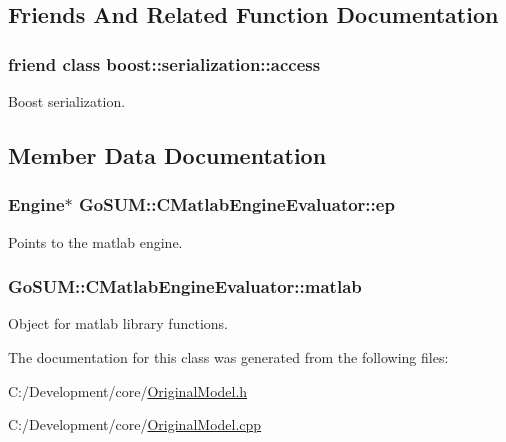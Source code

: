 \subsection{Friends And Related Function Documentation}
\hypertarget{class_go_s_u_m_1_1_c_matlab_engine_evaluator_ac98d07dd8f7b70e16ccb9a01abf56b9c}{
\subsubsection[{boost\-::serialization\-::access}]{\setlength{\rightskip}{0pt plus 5cm}friend class boost\-::serialization\-::access\hspace{0.3cm}{\ttfamily [friend]}}}\label{class_go_s_u_m_1_1_c_matlab_engine_evaluator_ac98d07dd8f7b70e16ccb9a01abf56b9c}


Boost serialization. 



\subsection{Member Data Documentation}
\hypertarget{class_go_s_u_m_1_1_c_matlab_engine_evaluator_a27f4cdd2025a3dbcc975dc75d8fffb14}{
\subsubsection[{ep}]{\setlength{\rightskip}{0pt plus 5cm}Engine$\ast$ Go\-S\-U\-M\-::\-C\-Matlab\-Engine\-Evaluator\-::ep\hspace{0.3cm}{\ttfamily [protected]}}}\label{class_go_s_u_m_1_1_c_matlab_engine_evaluator_a27f4cdd2025a3dbcc975dc75d8fffb14}


Points to the matlab engine. 

\hypertarget{class_go_s_u_m_1_1_c_matlab_engine_evaluator_ae5cb5436e2edaabb0f0db24d41daac0f}{
\subsubsection[{matlab}]{ Go\-S\-U\-M\-::\-C\-Matlab\-Engine\-Evaluator\-::matlab\hspace{0.3cm}{\ttfamily [protected]}}}\label{class_go_s_u_m_1_1_c_matlab_engine_evaluator_ae5cb5436e2edaabb0f0db24d41daac0f}
Object for matlab library functions. 

The documentation for this class was generated from the following files\-:\begin{DoxyCompactItemize}
\item 
C\-:/\-Development/core/\hyperlink{_original_model_8h}{Original\-Model.\-h}\item 
C\-:/\-Development/core/\hyperlink{_original_model_8cpp}{Original\-Model.\-cpp}\end{DoxyCompactItemize}
